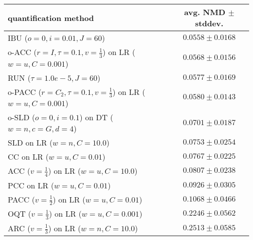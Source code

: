 \begin{tabular}{lc}
  \toprule
  quantification method & avg. NMD $\pm$ stddev. \\
  \midrule
  IBU ($o=0, i=0.01, J=60$) & $\mathbf{0.0558 \pm 0.0168}$ \\
  o-ACC ($r=I, \tau=0.1, v=\frac{1}{3}$) on LR ($w=u, C=0.001$) & $0.0568 \pm 0.0156$ \\
  RUN ($\tau=1.0e-5, J=60$) & $0.0577 \pm 0.0169$ \\
  o-PACC ($r=C_2, \tau=0.1, v=\frac{1}{3}$) on LR ($w=u, C=0.001$) & $0.0580 \pm 0.0143$ \\
  o-SLD ($o=0, i=0.1$) on DT ($w=n, c=G, d=4$) & $0.0701 \pm 0.0187$ \\
  SLD on LR ($w=n, C=10.0$) & $0.0753 \pm 0.0254$ \\
  CC on LR ($w=u, C=0.01$) & $0.0767 \pm 0.0225$ \\
  ACC ($v=\frac{1}{4}$) on LR ($w=u, C=10.0$) & $0.0807 \pm 0.0238$ \\
  PCC on LR ($w=u, C=0.01$) & $0.0926 \pm 0.0305$ \\
  PACC ($v=\frac{1}{2}$) on LR ($w=u, C=0.01$) & $0.1068 \pm 0.0466$ \\
  OQT ($v=\frac{1}{3}$) on LR ($w=u, C=0.001$) & $0.2246 \pm 0.0562$ \\
  ARC ($v=\frac{1}{3}$) on LR ($w=n, C=10.0$) & $0.2513 \pm 0.0585$ \\
  \bottomrule
\end{tabular}
